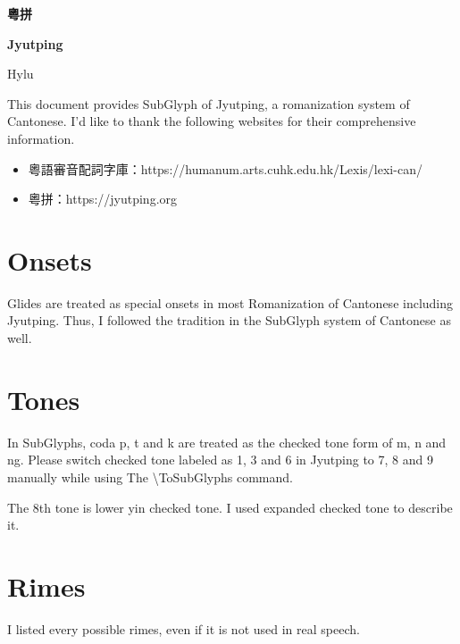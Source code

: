 \documentclass[12pt]{article}
\begin{document}

\begin{center}
    {\Huge \textbf{粵拼} \par}
    {\Huge \textbf{Jyutping} \par}
    {\Large Hylu \par}
    \hrulefill
\end{center}
This document provides SubGlyph of Jyutping, a romanization system of Cantonese. I'd like to thank the following websites for their comprehensive information. \par
\begin{itemize}
	\item 粵語審音配詞字庫：https://humanum.arts.cuhk.edu.hk/Lexis/lexi-can/
	\item 粵拼：https://jyutping.org
\end{itemize}

\section{Onsets}
Glides are treated as special onsets in most Romanization of Cantonese including Jyutping. Thus, I followed the tradition in the SubGlyph system of Cantonese as well. \par
%

\section{Tones}
In SubGlyphs, coda p, t and k are treated as the checked tone form of m, n and ng. Please switch checked tone labeled as 1, 3 and 6 in Jyutping to 7, 8 and 9 manually while using The {\textbackslash}ToSubGlyphs command. \par
The 8th tone is lower yin checked tone. I used expanded checked tone to describe it. \par
%

\section{Rimes}
I listed every possible rimes, even if it is not used in real speech. \par
%
\end{document}
